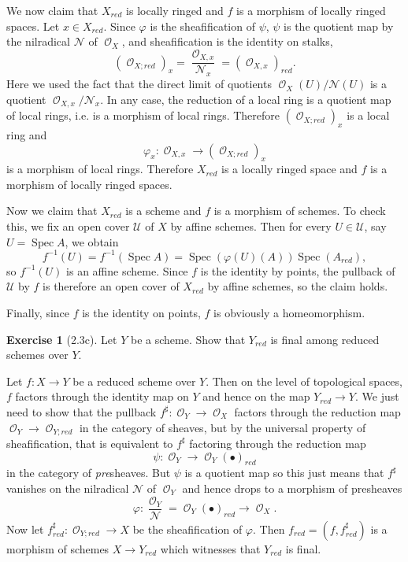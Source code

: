 \documentclass[10pt]{article}
\newcommand{\Spec}{\operatorname{Spec}}
\DeclareMathOperator{\Olo}{\mathscr O}
\theoremstyle{definition}
\newtheorem{exer}{Exercise}
\begin{document}
We now claim that $X_{red}$ is locally ringed and $f$ is a morphism of locally ringed spaces.
Let $x \in X_{red}$.
Since $\varphi$ is the sheafification of $\psi$, $\psi$ is the quotient map by the nilradical $\mathscr N$ of $\Olo_X$, and sheafification is the identity on stalks,
$$(\Olo_{X;red})_x = \frac{\Olo_{X, x}}{\mathscr N_x} = (\Olo_{X, x})_{red}.$$
Here we used the fact that the direct limit of quotients $\Olo_X(U)/\mathscr N(U)$ is a quotient $\Olo_{X,x}/\mathscr N_x$.
In any case, the reduction of a local ring is a quotient map of local rings, i.e. is a morphism of local rings.
Therefore $(\Olo_{X;red})_x$ is a local ring and
$$\varphi_x: \Olo_{X, x} \to (\Olo_{X;red})_x$$
is a morphism of local rings.
Therefore $X_{red}$ is a locally ringed space and $f$ is a morphism of locally ringed spaces.

Now we claim that $X_{red}$ is a scheme and $f$ is a morphism of schemes.
To check this, we fix an open cover $\mathcal U$ of $X$ by affine schemes.
Then for every $U \in \mathcal U$, say $U = \Spec A$, we obtain
$$f^{-1}(U) = f^{-1}(\Spec A) = \Spec(\varphi(U)(A)) \Spec(A_{red}),$$
so $f^{-1}(U)$ is an affine scheme.
Since $f$ is the identity by points, the pullback of $\mathcal U$ by $f$ is therefore an open cover of $X_{red}$ by affine schemes, so the claim holds.

Finally, since $f$ is the identity on points, $f$ is obviously a homeomorphism.

\begin{exer}[2.3c]
Let $Y$ be a scheme.
Show that $Y_{red}$ is final among reduced schemes over $Y$.
\end{exer}

Let $f: X \to Y$ be a reduced scheme over $Y$.
Then on the level of topological spaces, $f$ factors through the identity map on $Y$ and hence on the map $Y_{red} \to Y$.
We just need to show that the pullback $f^\sharp: \Olo_Y \to \Olo_X$ factors through the reduction map $\Olo_Y \to \Olo_{Y;red}$ in the category of sheaves, but by the universal property of sheafification, that is equivalent to $f^\sharp$ factoring through the reduction map
$$\psi: \Olo_Y \to \Olo_Y(\bullet)_{red}$$
in the category of \emph{pre}sheaves.
But $\psi$ is a quotient map so this just means that $f^\sharp$ vanishes on the nilradical $\mathscr N$ of $\Olo_Y$ and hence drops to a morphism of presheaves
$$\varphi: \frac{\Olo_Y}{\mathscr N} = \Olo_Y(\bullet)_{red} \to \Olo_X.$$
Now let $f^\sharp_{red}: \Olo_{Y;red} \to X$ be the sheafification of $\varphi$.
Then $f_{red} = (f, f^\sharp_{red})$ is a morphism of schemes $X \to Y_{red}$ which witnesses that $Y_{red}$ is final.
\end{document}
